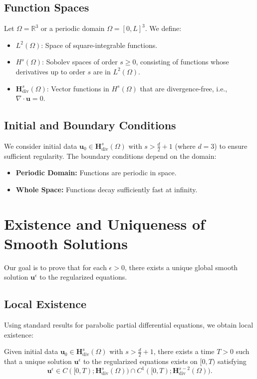 \documentclass[12pt]{article}
\begin{document}
\subsection{Function Spaces}
Let \(\Omega = \mathbb{R}^3\) or a periodic domain \(\Omega = [0, L]^3\). We define:

\begin{itemize}
    \item \(L^2(\Omega)\): Space of square-integrable functions.
    \item \(H^s(\Omega)\): Sobolev spaces of order \(s \geq 0\), consisting of functions whose derivatives up to order \(s\) are in \(L^2(\Omega)\).
    \item \(\mathbf{H}^s_{\text{div}}(\Omega)\): Vector functions in \(H^s(\Omega)\) that are divergence-free, i.e., \(\nabla \cdot \mathbf{u} = 0\).
\end{itemize}

\subsection{Initial and Boundary Conditions}
We consider initial data \(\mathbf{u}_0 \in \mathbf{H}^s_{\text{div}}(\Omega)\) with \(s > \frac{d}{2} + 1\) (where \(d=3\)) to ensure sufficient regularity. The boundary conditions depend on the domain:

\begin{itemize}
    \item \textbf{Periodic Domain:} Functions are periodic in space.
    \item \textbf{Whole Space:} Functions decay sufficiently fast at infinity.
\end{itemize}

\section{Existence and Uniqueness of Smooth Solutions}
Our goal is to prove that for each \(\epsilon > 0\), there exists a unique global smooth solution \(\mathbf{u}^\epsilon\) to the regularized equations.

\subsection{Local Existence}
Using standard results for parabolic partial differential equations, we obtain local existence:

\begin{theorem}
Given initial data \(\mathbf{u}_0 \in \mathbf{H}^s_{\text{div}}(\Omega)\) with \(s > \frac{d}{2} + 1\), there exists a time \(T > 0\) such that a unique solution \(\mathbf{u}^\epsilon\) to the regularized equations exists on \([0, T)\) satisfying
\[
\mathbf{u}^\epsilon \in C([0, T); \mathbf{H}^s_{\text{div}}(\Omega)) \cap C^1([0, T); \mathbf{H}^{s - 2}_{\text{div}}(\Omega)).
\]
\end{theorem}
\end{document}
